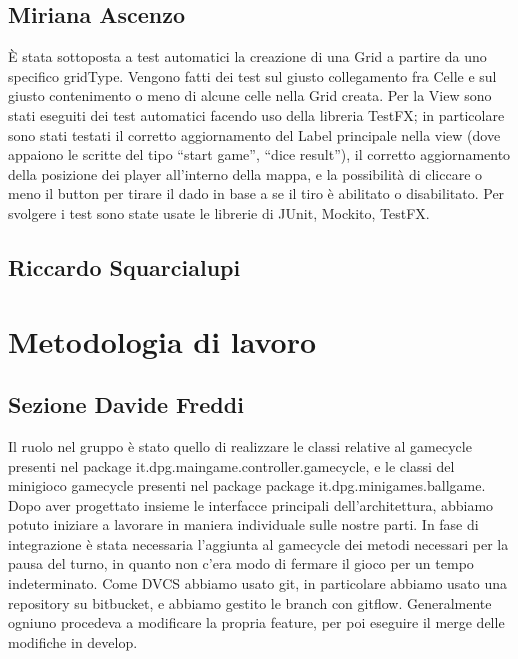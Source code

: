 \documentclass[a4paper,12pt]{report}
\begin{document}
	\subsection{Miriana Ascenzo}

	È stata sottoposta a test automatici la creazione di una Grid a partire da uno specifico gridType.
	Vengono fatti dei test sul giusto collegamento fra Celle e sul giusto contenimento o meno di alcune celle nella Grid creata.
	Per la View sono stati eseguiti dei test automatici facendo uso della libreria TestFX; in particolare sono stati testati il corretto aggiornamento del Label principale nella view (dove appaiono le scritte del tipo “start game”, “dice result”),
	il corretto aggiornamento della posizione dei player all'interno della mappa, e la possibilità di cliccare o meno il button per tirare il dado in base a se il tiro è abilitato o disabilitato.
    Per svolgere i test sono state usate le librerie di JUnit, Mockito, TestFX.


	\subsection{Riccardo Squarcialupi}

	\section{Metodologia di lavoro}

	\subsection{Sezione Davide Freddi}

	Il ruolo nel gruppo è stato quello di realizzare le classi relative al gamecycle presenti nel package it.dpg.maingame.controller.gamecycle, e le classi del minigioco gamecycle presenti nel package package it.dpg.minigames.ballgame.
    Dopo aver progettato insieme le interfacce principali dell'architettura, abbiamo potuto iniziare a lavorare in maniera individuale sulle nostre parti.
    In fase di integrazione è stata necessaria l'aggiunta al gamecycle dei metodi necessari per la pausa del turno, in quanto non c'era modo di fermare il gioco per un tempo indeterminato.
    Come DVCS abbiamo usato git, in particolare abbiamo usato una repository su bitbucket, e abbiamo gestito le branch con gitflow.
    Generalmente ogniuno procedeva a modificare la propria feature, per poi eseguire il merge delle modifiche in develop.
\end{document}
